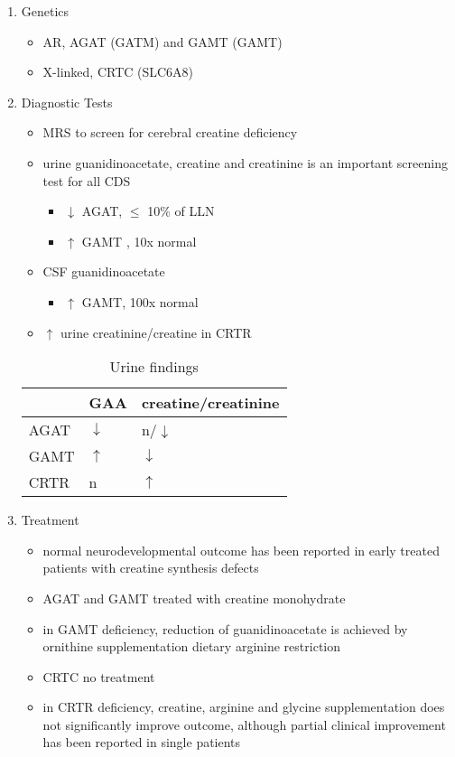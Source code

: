 \documentclass{scrartcl}
\begin{document}
\begin{enumerate}
\item Genetics
\label{sec:orgb6a94dc}
\begin{itemize}
\item AR, AGAT (GATM) and GAMT (GAMT)
\item X-linked, CRTC (SLC6A8)
\end{itemize}
\item Diagnostic Tests
\label{sec:orgc76b5a7}
\begin{itemize}
\item MRS to screen for cerebral creatine deficiency
\item urine guanidinoacetate, creatine and creatinine is an important
screening test for all CDS
\begin{itemize}
\item \(\downarrow\) AGAT, \(\le\) 10\% of LLN
\item \(\uparrow\) GAMT , 10x normal
\end{itemize}
\item CSF guanidinoacetate
\begin{itemize}
\item \(\uparrow\) GAMT, 100x normal
\end{itemize}
\item \(\uparrow\) urine creatinine/creatine in CRTR
\end{itemize}


\begin{table}[htbp]
\caption{\label{tab:org20c4ad0}
Urine findings}
\centering
\begin{tabular}{lll}
 & GAA & creatine/creatinine\\
\hline
AGAT & \(\downarrow\) & n/\(\downarrow\)\\
GAMT & \(\uparrow\) & \(\downarrow\)\\
CRTR & n & \(\uparrow\)\\
\end{tabular}
\end{table}

\item Treatment
\label{sec:org744056c}
\begin{itemize}
\item normal neurodevelopmental outcome has been reported in early treated
patients with creatine synthesis defects
\item AGAT and GAMT treated with creatine monohydrate
\item in GAMT deficiency, reduction of guanidinoacetate is achieved by
ornithine supplementation \textpm{} dietary arginine restriction
\item CRTC no treatment
\item in CRTR deficiency, creatine, arginine and glycine supplementation
does not significantly improve outcome, although partial clinical
improvement has been reported in single patients
\end{itemize}
\end{enumerate}
\end{document}
